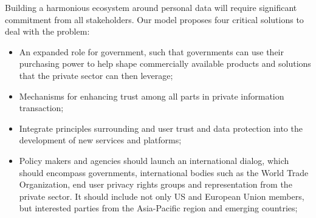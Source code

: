 \documentclass[a4paper,12pt]{texMemo} %
\begin{document}
Building a harmonious ecosystem around personal data will require significant commitment from all stakeholders. Our model proposes four critical solutions to deal with the problem:
\begin{itemize}
\item An expanded role for government, such that governments can use their purchasing power to help shape commercially available products and solutions that the private sector can then leverage;
\item Mechanisms for enhancing trust among all parts in private information transaction;

\item Integrate principles surrounding and user trust and data protection into the development of new services and platforms;
\item Policy makers and agencies should launch an international dialog, which should encompass governments, international bodies such as the World Trade Organization, end user privacy rights groups and representation from the private sector. It should include not only US and European Union members, but interested parties from the Asia-Pacific region and emerging countries;
\end{itemize}

\end{document}
